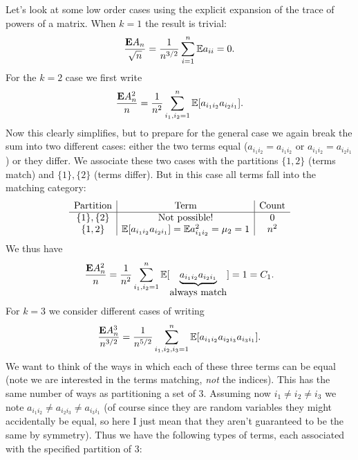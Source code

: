 Let's look at some low order cases using the explicit expansion of the trace of powers of a matrix. When $k = 1$ the result is trivial:
\[
{\bm{\mathrm{E}} A_n \over \sqrt{n}} = {1 \over n^{3/2}} \sum_{i=1}^n {\mathbb E} a_{ii} = 0.
\]
For the $k = 2$ case we first write
\[
{\bm{\mathrm{E}} A_n^2 \over n}  = {1 \over n^2} \sum_{i_1,i_2=1}^n {\mathbb E}[a_{i_1i_2} a_{i_2i_1}].
\]
Now this clearly simplifies, but to prepare for the general case we again break the sum into two different cases: either the two terms equal ($a_{i_1i_2} = a_{i_1i_2}$ or $a_{i_1i_2} = a_{i_2i_1}$) or they differ. We associate these two cases with the partitions $\{1,2\}$ (terms match) and $\{1\}, \{2\}$ (terms differ).  But in this case all terms fall into the matching category:
\[
\begin{array}{c | c | c}
\hbox{Partition} & \hbox{Term} & \hbox{Count} \\
\hline
  \{1\}, \{2\}  &  \hbox{Not possible!} &  0\\
    \{1,2\} & {\mathbb E}[a_{i_1i_2} a_{i_2i_1}] = {\mathbb E} a_{i_1i_2}^2 = \mu_2 = 1  & n^2 
\end{array}
\]
We thus have 
\[
{\bm{\mathrm{E}} A_n^2 \over n} = {1 \over n^2} \sum_{i_1,i_2=1}^n {\mathbb E}[\underbrace{a_{i_1i_2} a_{i_2i_1}}_{\hbox{always match}}]  = 1 = C_1.
\]
For $k = 3$ we consider different cases of writing
\[
{\bm{\mathrm{E}} A_n^3 \over n^{3/2}} = {1 \over n^{5/2}} \sum_{i_1,i_2,i_3=1}^n {\mathbb E}[a_{i_1i_2}a_{i_2i_3}a_{i_3i_1}].
\]
We want to think of the ways in which each of these three terms can be equal (note we are interested in the terms matching, \emph{not} the indices). This has  the same number of ways as partitioning a set of 3. Assuming now $i_1 \ensuremath{\neq} i_2 \ensuremath{\neq} i_3$ we note $a_{i_1i_2} \ensuremath{\neq} a_{i_2 i_3} \ensuremath{\neq} a_{i_3 i_1}$ (of course since they are random variables they might accidentally be equal, so here I just mean that they aren't guaranteed to be the same by symmetry). Thus we have the following types of terms, each associated with the specified partition of 3:
